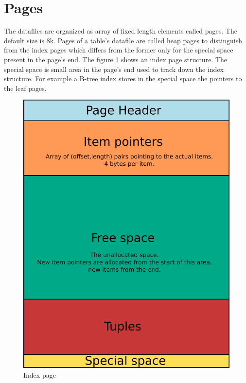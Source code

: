 \section{Pages}
The datafiles are organized as array of fixed length elements called pages. The 
default size is 8k. Pages of a table's datafile are called heap 
pages to distinguish from the index pages 
which differs from the former only for the special space present in the page's 
end. The figure \ref{fig:INDEX01} shows an index page structure. The special 
space is small area in the page's end used to track down the index structure. 
For example a B-tree index stores in the special space the pointers to the leaf 
pages.

\begin{figure}[H]
\begin{center}

\includegraphics[scale=0.35]{images/index_page_01.png}

\caption{Index page}
\label{fig:INDEX01} 
\end{center}

\end{figure}

